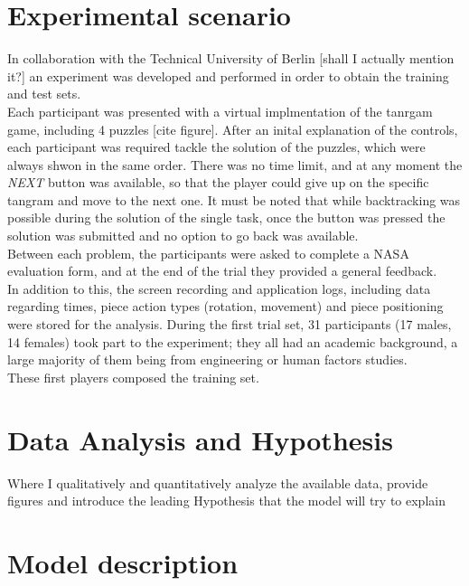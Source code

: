\documentclass[a4paper,singleside,12pt]{report} %
\begin{document}
	\chapter{Experimental scenario}
    In collaboration with the Technical University of Berlin [shall I actually mention it?] an experiment was developed and performed in order to obtain the training and test sets.\\
	Each participant was presented with a virtual implmentation of the tanrgam game, including 4 puzzles [cite figure]. After an inital explanation of the controls, each participant was required tackle
	the solution of the puzzles, which were always shwon in the same order. There was no time limit, and at any moment the \textit{NEXT} button was available, so that the player could give up on the specific
	tangram and move to the next one. It must be noted that while backtracking was possible during the solution of the single task, once the button was pressed the solution was submitted and no option to go back
	was available.\\
	Between each problem, the participants were asked to complete a NASA evaluation form, and at the end of the trial they provided a general feedback. \\
	In addition to this, the screen recording and application logs, including data regarding times, piece action types (rotation, movement) and piece positioning were stored for the analysis. 
	During the first trial set, 31 participants (17 males, 14 females) took part to the experiment; they all had an academic background, a large majority of them being from engineering or human factors studies. \\
	These first players composed the training set.
    
	
	\chapter{Data Analysis and Hypothesis}
    Where I qualitatively and quantitatively analyze the available data, provide figures and introduce
    the leading Hypothesis that the model will try to explain
    
	
	\chapter{Model description}
    
\end{document}
